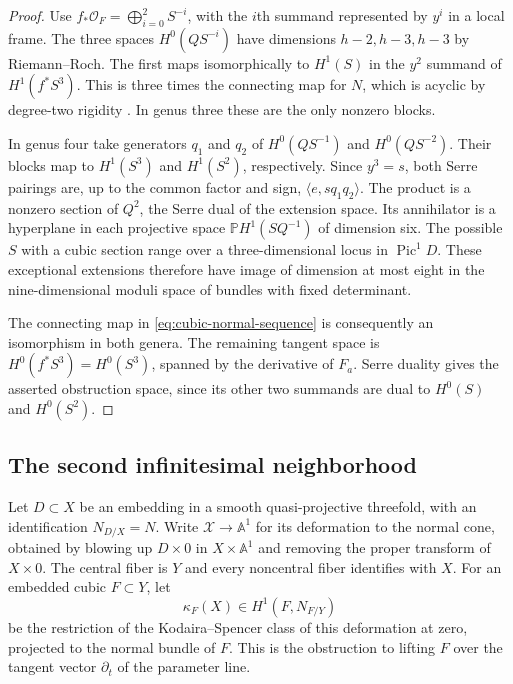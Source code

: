 \begin{proof}
Use $f_*\mathcal O_F=\bigoplus_{i=0}^2 S^{-i}$, with the $i$th
summand represented by $y^i$ in a local frame. The three spaces
$H^0(QS^{-i})$ have dimensions $h-2,h-3,h-3$ by Riemann--Roch.
The first maps isomorphically to $H^1(S)$ in the $y^2$ summand of
$H^1(f^*S^3)$. This is three times the connecting map for $N$,
which is acyclic by degree-two rigidity
\cite[Theorem~2.2]{BP06}. In genus three these are the only nonzero
blocks.

In genus four take generators $q_1$ and $q_2$ of $H^0(QS^{-1})$
and $H^0(QS^{-2})$. Their blocks map to $H^1(S^3)$ and $H^1(S^2)$,
respectively. Since $y^3=s$, both Serre pairings are, up to the
common factor and sign, $\langle e,sq_1q_2\rangle$. The product is
a nonzero section of $Q^2$, the Serre dual of the extension space.
Its annihilator is a hyperplane in each projective space
$\mathbb P H^1(SQ^{-1})$ of dimension six. The possible $S$ with
a cubic section range over a three-dimensional locus in
$\operatorname{Pic}^1D$. These exceptional extensions therefore
have image of dimension at most eight in the nine-dimensional
moduli space of bundles with fixed determinant.

The connecting map in \eqref{eq:cubic-normal-sequence} is consequently
an isomorphism in both genera. The remaining tangent space is
$H^0(f^*S^3)=H^0(S^3)$, spanned by the derivative of $F_a$.
Serre duality gives the asserted obstruction space, since its other
two summands are dual to $H^0(S)$ and $H^0(S^2)$.
\end{proof}

\subsection{The second infinitesimal neighborhood}

Let $D\subset X$ be an embedding in a smooth quasi-projective
threefold, with an identification $N_{D/X}=N$. Write
$\mathcal X\to\mathbb A^1$ for its deformation to the normal cone, obtained by
blowing up $D\times0$ in $X\times\mathbb A^1$ and removing the proper
transform of $X\times0$. The central fiber is $Y$ and every
noncentral fiber identifies with $X$. For an embedded cubic
$F\subset Y$, let
\begin{equation}\label{eq:cubic-unfolding}
        \kappa_F(X)\in H^1(F,N_{F/Y})
\end{equation}
be the restriction of the Kodaira--Spencer class of this deformation
at zero, projected to the normal bundle of $F$. This is the
obstruction to lifting $F$ over the tangent vector $\partial_t$ of
the parameter line.

